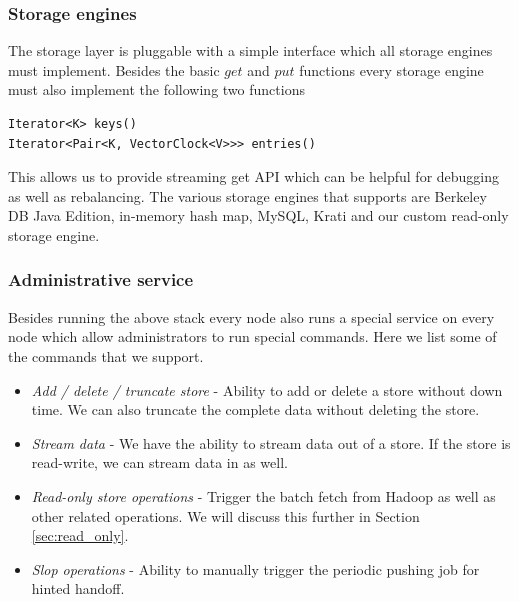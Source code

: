 \documentclass[10pt,twocolumn,preprint,natbib,authoryear]{sigplanconf}
\begin{document}

\subsubsection {Storage engines}
\label{sec:system_architecture:system_components:storage_engine}

The storage layer is pluggable with a simple interface which all storage engines must implement. Besides the basic $get$ and $put$ functions every storage engine must also implement the following two functions 

\scriptsize
\begin{verbatim}
Iterator<K> keys() 
Iterator<Pair<K, VectorClock<V>>> entries()
\end{verbatim}  
\normalsize

This allows us to provide streaming get API which can be helpful for debugging as well as rebalancing. The various storage engines that \projectname{} supports are Berkeley DB Java Edition, in-memory hash map, MySQL, Krati and our custom read-only storage engine. 


\subsubsection{Administrative service}
\label{sec:system_architecture:system_components:admin_service}

Besides running the above stack every node also runs a special service on every node which allow administrators to run special commands. Here we list some of the commands that we support.

\begin{itemize}
	
	\item \emph{Add / delete / truncate store} - Ability to add or delete a store without down time. We can also truncate the complete data without deleting the store. 
	\item \emph{Stream data} - We have the ability to stream data out of a store. If the store is read-write, we can stream data in as well. 
	\item \emph{Read-only store operations} - Trigger the batch fetch from Hadoop as well as other related operations. We will discuss this further in Section \ref{sec:read_only}. 
	\item \emph{Slop operations} - Ability to manually trigger the periodic pushing job for hinted handoff. 
	
\end{itemize}
\end{document}
